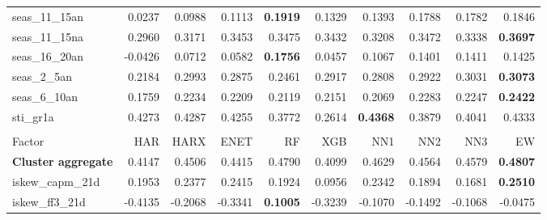 \begin{longtable}{>{\raggedright\arraybackslash}p{2.6cm}rrrrrrrrr}
seas\_11\_15an & 0.0237 & \cellcolor{blue!10}0.0988 & \cellcolor{blue!10}0.1113 & \textbf{\cellcolor{blue!10}0.1919} & \cellcolor{blue!10}0.1329 & \cellcolor{blue!10}0.1393 & \cellcolor{blue!10}0.1788 & \cellcolor{blue!10}0.1782 & \cellcolor{blue!10}0.1846 \\
seas\_11\_15na & 0.2960 & \cellcolor{blue!10}0.3171 & \cellcolor{blue!10}0.3453 & \cellcolor{blue!10}0.3475 & \cellcolor{blue!10}0.3432 & \cellcolor{blue!10}0.3208 & \cellcolor{blue!10}0.3472 & \cellcolor{blue!10}0.3338 & \textbf{\cellcolor{blue!10}0.3697} \\
seas\_16\_20an & -0.0426 & \cellcolor{blue!10}0.0712 & \cellcolor{blue!10}0.0582 & \textbf{\cellcolor{blue!10}0.1756} & \cellcolor{blue!10}0.0457 & \cellcolor{blue!10}0.1067 & \cellcolor{blue!10}0.1401 & \cellcolor{blue!10}0.1411 & \cellcolor{blue!10}0.1425 \\
seas\_2\_5an & 0.2184 & \cellcolor{blue!10}0.2993 & \cellcolor{blue!10}0.2875 & \cellcolor{blue!10}0.2461 & \cellcolor{blue!10}0.2917 & \cellcolor{blue!10}0.2808 & \cellcolor{blue!10}0.2922 & \cellcolor{blue!10}0.3031 & \textbf{\cellcolor{blue!10}0.3073} \\
seas\_6\_10an & 0.1759 & \cellcolor{blue!10}0.2234 & \cellcolor{blue!10}0.2209 & \cellcolor{blue!10}0.2119 & \cellcolor{blue!10}0.2151 & \cellcolor{blue!10}0.2069 & \cellcolor{blue!10}0.2283 & \cellcolor{blue!10}0.2247 & \textbf{\cellcolor{blue!10}0.2422} \\
sti\_gr1a & 0.4273 & \cellcolor{blue!10}0.4287 & 0.4255 & 0.3772 & 0.2614 & \textbf{\cellcolor{blue!10}0.4368} & 0.3879 & 0.4041 & \cellcolor{blue!10}0.4333 \\
\hline
\multicolumn{10}{@{}l}{\textit{Panel K. Short-Term Reversal}} \\
\hline
Factor & HAR & HARX & ENET & RF & XGB & NN1 & NN2 & NN3 & EW \\
\hline
\textbf{Cluster aggregate} & 0.4147 & \cellcolor{blue!10}0.4506 & \cellcolor{blue!10}0.4415 & \cellcolor{blue!10}0.4790 & 0.4099 & \cellcolor{blue!10}0.4629 & \cellcolor{blue!10}0.4564 & \cellcolor{blue!10}0.4579 & \textbf{\cellcolor{blue!10}0.4807} \\
iskew\_capm\_21d & 0.1953 & \cellcolor{blue!10}0.2377 & \cellcolor{blue!10}0.2415 & 0.1924 & 0.0956 & \cellcolor{blue!10}0.2342 & 0.1894 & 0.1681 & \textbf{\cellcolor{blue!10}0.2510} \\
iskew\_ff3\_21d & -0.4135 & \cellcolor{blue!10}-0.2068 & \cellcolor{blue!10}-0.3341 & \textbf{\cellcolor{blue!10}0.1005} & \cellcolor{blue!10}-0.3239 & \cellcolor{blue!10}-0.1070 & \cellcolor{blue!10}-0.1492 & \cellcolor{blue!10}-0.1068 & \cellcolor{blue!10}-0.0475 \\

\end{longtable}
